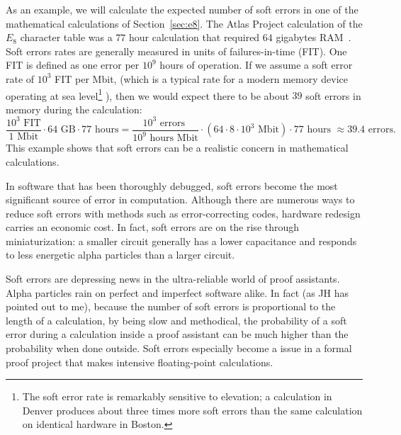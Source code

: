 \documentclass{llncs}
\begin{document}
As an example, we will calculate the expected
number of soft errors in one of the mathematical calculations of
Section~\ref{sec:e8}.  The Atlas Project calculation of
the $E_8$ character table was a $77$ hour calculation that required
$64$ gigabytes RAM~\cite{AtlasSlides}.  Soft errors rates are generally measured in units
of failures-in-time (FIT). One FIT is defined as one error per $10^9$
hours of operation.
If we assume a soft error rate of $10^3$ FIT per Mbit, (which is a
typical rate for a modern memory device operating at sea
level\footnote{The soft error rate is remarkably sensitive to
  elevation; a calculation in Denver produces about three times more
  soft errors than the same calculation on identical hardware in Boston.}
\cite{WP}),
 then we would expect there to be about $39$ soft
errors in memory during the calculation:
\[
\frac{10^3 \text{~FIT}}{1\text{~Mbit}} \cdot 64 \text{~GB} \cdot 77\text{~hours} =
\frac{10^3 \text{~errors~}}{10^9\text{~hours~}\text{Mbit}} \cdot
({64\cdot 8\cdot 10^3 \text{~Mbit}}) \cdot 77\text{~hours~} 
\approx 39.4 \text{~errors}.
\]
This example shows that soft errors can be a realistic concern in
mathematical calculations.

In software that has been thoroughly debugged, soft errors become the
most significant source of error in computation.  Although there are
numerous ways to reduce soft errors with methods such as error-correcting
codes, hardware redesign carries an economic cost.  In fact, soft errors are on
the rise through miniaturization: a smaller circuit generally has a lower
capacitance and responds to less energetic alpha particles than a larger
circuit.

Soft errors are depressing news in the ultra-reliable world of proof
assistants.  Alpha particles rain on perfect and imperfect software
alike.  In fact (as JH has pointed out to me), because the number of
soft errors is proportional to the length of a calculation, by being
slow and methodical, the probability of a soft error during a
calculation inside a proof assistant can be much higher than the
probability when done outside.  
Soft errors especially become a issue in a formal proof project that
makes intensive floating-point calculations.
\end{document}
